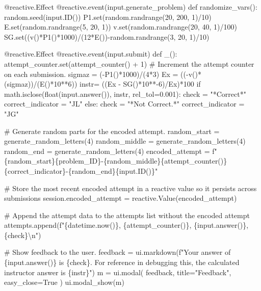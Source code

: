\documentclass[
  letterpaper,
  DIV=11,
  numbers=noendperiod]{scrreprt}
\newenvironment{Shaded}{\begin{snugshade}}{\end{snugshade}}
\newcommand{\NormalTok}[1]{\textcolor[rgb]{0.00,0.23,0.31}{#1}}
\begin{document}
\begin{Shaded}
\begin{Highlighting}[]
\NormalTok{    @reactive.Effect}
\NormalTok{    @reactive.event(input.generate\_problem)}
\NormalTok{    def randomize\_vars():}
\NormalTok{        random.seed(input.ID())}
\NormalTok{        P1.set(random.randrange(20, 200, 1)/10)}
\NormalTok{        E.set(random.randrange(5, 20, 1))}
\NormalTok{        v.set(random.randrange(20, 40, 1)/100)}
\NormalTok{        SG.set((v()*P1()*1000)/(12*E()){-}random.randrange(3, 20, 1)/10)}
        
\NormalTok{    @reactive.Effect}
\NormalTok{    @reactive.event(input.submit)}
\NormalTok{    def \_():}
\NormalTok{        attempt\_counter.set(attempt\_counter() + 1)  \# Increment the attempt counter on each submission.}
\NormalTok{        sigmaz = ({-}P1()*1000)/(4*3)}
\NormalTok{        Ex = (({-}v()*(sigmaz))/(E()*10**6))}
\NormalTok{        instr=  ((Ex {-} SG()*10**{-}6)/Ex)*100}
\NormalTok{        if math.isclose(float(input.answer()), instr, rel\_tol=0.001):}
\NormalTok{            check = "*Correct*"}
\NormalTok{            correct\_indicator = "JL"}
\NormalTok{        else:}
\NormalTok{            check = "*Not Correct.*"}
\NormalTok{            correct\_indicator = "JG"}

\NormalTok{        \# Generate random parts for the encoded attempt.}
\NormalTok{        random\_start = generate\_random\_letters(4)}
\NormalTok{        random\_middle = generate\_random\_letters(4)}
\NormalTok{        random\_end = generate\_random\_letters(4)}
\NormalTok{        encoded\_attempt = f"\{random\_start\}\{problem\_ID\}{-}\{random\_middle\}\{attempt\_counter()\}\{correct\_indicator\}{-}\{random\_end\}\{input.ID()\}"}

\NormalTok{        \# Store the most recent encoded attempt in a reactive value so it persists across submissions}
\NormalTok{        session.encoded\_attempt = reactive.Value(encoded\_attempt)}

\NormalTok{        \# Append the attempt data to the attempts list without the encoded attempt}
\NormalTok{        attempts.append(f"\{datetime.now()\}, \{attempt\_counter()\}, \{input.answer()\}, \{check\}\textbackslash{}n")}

\NormalTok{        \# Show feedback to the user.}
\NormalTok{        feedback = ui.markdown(f"Your answer of \{input.answer()\} is \{check\}. For reference in debugging this, the calculated instructor answer is \{instr\}")}
\NormalTok{        m = ui.modal(}
\NormalTok{            feedback,}
\NormalTok{            title="Feedback",}
\NormalTok{            easy\_close=True}
\NormalTok{        )}
\NormalTok{        ui.modal\_show(m)}


\end{Highlighting}
\end{Shaded}
\end{document}
